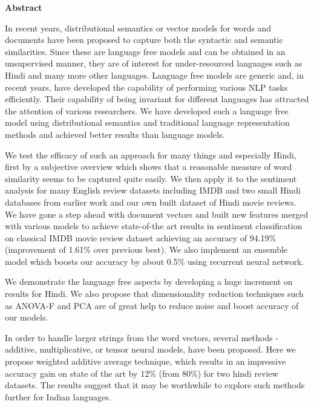 \cleardoublepage

\begin{center}
	\huge{\textbf{Abstract}}
\end{center}

In recent years, distributional semantics or vector models for words and documents have been proposed to capture both the syntactic and semantic similarities. Since these are language free models and can be obtained in an unsupervised manner, they are of interest for under-resourced languages such as Hindi and many more other languages. 
Language free models are generic and, in recent years, have developed the capability of performing various NLP tasks efficiently. Their capability of being invariant for different languages has attracted the attention of various researchers. We have developed such a language free model using distributional semantics and traditional language representation methods and achieved better results than language models.

We test the efficacy of such an approach for many things and especially Hindi, first by a subjective overview which shows that a reasonable measure of word similarity seems to be captured quite easily.  We then apply it to the sentiment analysis for many English review datasets including IMDB and two small Hindi databases from earlier work and our own built dataset of Hindi movie reviews. 
We have gone a step ahead with document vectors and built new features merged with various models to achieve state-of-the art results in sentiment classification on classical IMDB movie review dataset achieving an accuracy of 94.19\%(improvement of 1.61\% over previous best). We also implement an ensemble model which boosts our accuracy by about 0.5\% using recurrent neural network.

We demonstrate the language free aspects by developing a huge increment on results for Hindi. We also propose that dimensionality reduction techniques such as ANOVA-F and PCA are of great help to reduce noise and boost accuracy of our models.

In order to handle larger strings from the word vectors, several methods - additive, multiplicative, or tensor neural models, have been proposed.  Here we propose weighted additive average technique, which results in an impressive accuracy gain on state of the art by 12\% (from 80\%) for two hindi review datasets.  The results suggest that it may be worthwhile to explore such methods further for Indian languages.\\

